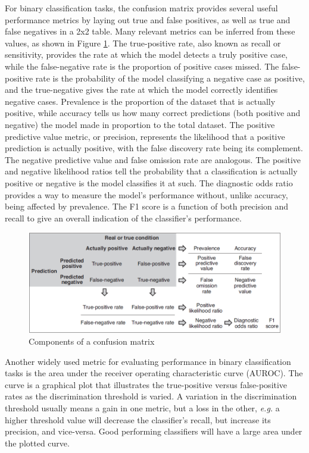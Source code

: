 For binary classification tasks, the confusion matrix provides several useful performance metrics by laying out true and false positives, as well as true and false negatives in a 2x2 table. Many relevant metrics can be inferred from these values, as shown in Figure \ref{fig:confusion_matrix}. The true-positive rate, also known as recall or sensitivity, provides the rate at which the model detects a truly positive case, while the false-negative rate is the proportion of positive cases missed. The false-positive rate is the probability of the model classifying a negative case as positive, and the true-negative gives the rate at which the model correctly identifies negative cases. Prevalence is the proportion of the dataset that is actually positive, while accuracy tells us how many correct predictions (both positive and negative) the model made in proportion to the total dataset. The positive predictive value metric, or precision, represents the likelihood that a positive prediction is actually positive, with the false discovery rate being its complement. The negative predictive value and false omission rate are analogous. The positive and negative likelihood ratios tell the probability that a classification is actually positive or negative is the model classifies it at such. The diagnostic odds ratio provides a way to measure the model's performance without, unlike accuracy, being affected by prevalence. The F1 score is a function of both precision and recall to give an overall indication of the classifier's performance.

\begin{figure}
    \centering
    \includegraphics[width = .7\textwidth]{img/parts/introduction/Confusion Matrix.png}
    \caption{Components of a confusion matrix \citep{Handelman2019}}
    \label{fig:confusion_matrix}
\end{figure}

Another widely used metric for evaluating performance in binary classification tasks is the area under the receiver operating characteristic curve (AUROC). The curve is a graphical plot that illustrates the true-positive versus false-positive rates as the discrimination threshold is varied. A variation in the discrimination threshold usually means a gain in one metric, but a loss in the other, \textit{e.g.} a higher threshold value will decrease the classifier's recall, but increase its precision, and vice-versa. Good performing classifiers will have a large area under the plotted curve.\par

